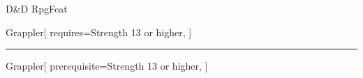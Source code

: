 \begin{ExampleBlock}{D\&D RpgFeat}

    
\begin{RpgFeat}{Grappler}[
     requires={Strength 13 or higher},
          ]
    \grapplerText %
\end{RpgFeat}

\vspace{0.25cm}\hrule\vspace{0.25cm}

    
\begin{RpgFeat}[color=DmgLilac]{Grappler}[
     prerequisite={Strength 13 or higher},
        ]
   \grapplerText
\end{RpgFeat}


\end{ExampleBlock}
